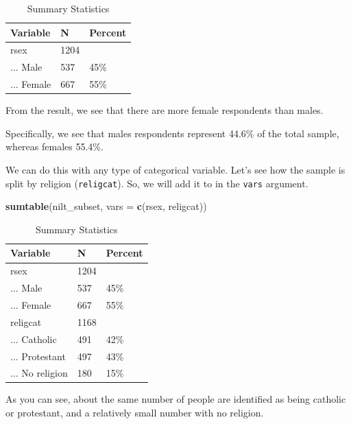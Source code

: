 \documentclass[
]{book}
\newenvironment{Shaded}{\begin{snugshade}}{\end{snugshade}}
\newcommand{\AttributeTok}[1]{\textcolor[rgb]{0.13,0.29,0.53}{#1}}
\newcommand{\FunctionTok}[1]{\textcolor[rgb]{0.13,0.29,0.53}{\textbf{#1}}}
\newcommand{\NormalTok}[1]{#1}
\newcommand{\StringTok}[1]{\textcolor[rgb]{0.31,0.60,0.02}{#1}}
\begin{document}
\begin{table}

\caption{\label{tab:unnamed-chunk-50}Summary Statistics}
\centering
\begin{tabular}[t]{lll}
\toprule
Variable & N & Percent\\
\midrule
rsex & 1204 & \\
... Male & 537 & 45\%\\
... Female & 667 & 55\%\\
\bottomrule
\end{tabular}
\end{table}

From the result, we see that there are more female respondents than males.

Specifically, we see that males respondents represent 44.6\% of the total sample, whereas females 55.4\%.

We can do this with any type of categorical variable. Let's see how the sample is split by religion (\texttt{religcat}). So, we will add it to in the \texttt{vars} argument.

\begin{Shaded}
\begin{Highlighting}[]
\FunctionTok{sumtable}\NormalTok{(nilt\_subset, }\AttributeTok{vars =} \FunctionTok{c}\NormalTok{(}\StringTok{\textquotesingle{}rsex\textquotesingle{}}\NormalTok{, }\StringTok{\textquotesingle{}religcat\textquotesingle{}}\NormalTok{))}
\end{Highlighting}
\end{Shaded}

\begin{table}

\caption{\label{tab:unnamed-chunk-51}Summary Statistics}
\centering
\begin{tabular}[t]{lll}
\toprule
Variable & N & Percent\\
\midrule
rsex & 1204 & \\
... Male & 537 & 45\%\\
... Female & 667 & 55\%\\
religcat & 1168 & \\
... Catholic & 491 & 42\%\\
\addlinespace
... Protestant & 497 & 43\%\\
... No religion & 180 & 15\%\\
\bottomrule
\end{tabular}
\end{table}

As you can see, about the same number of people are identified as being catholic or protestant, and a relatively small number with no religion.
\end{document}
